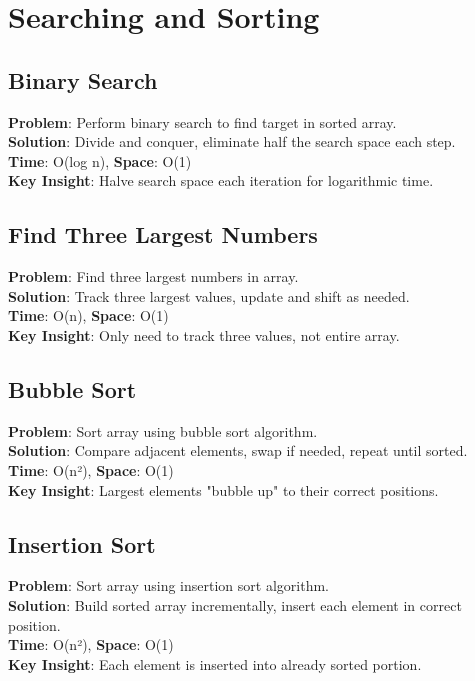 \documentclass{report}
\begin{document}
\section{Searching and Sorting}

\subsection{Binary Search}
\textbf{Problem}: Perform binary search to find target in sorted array.\\
\textbf{Solution}: Divide and conquer, eliminate half the search space each step.\\
\textbf{Time}: O(log n), \textbf{Space}: O(1)\\
\textbf{Key Insight}: Halve search space each iteration for logarithmic time.

\subsection{Find Three Largest Numbers}
\textbf{Problem}: Find three largest numbers in array.\\
\textbf{Solution}: Track three largest values, update and shift as needed.\\
\textbf{Time}: O(n), \textbf{Space}: O(1)\\
\textbf{Key Insight}: Only need to track three values, not entire array.

\subsection{Bubble Sort}
\textbf{Problem}: Sort array using bubble sort algorithm.\\
\textbf{Solution}: Compare adjacent elements, swap if needed, repeat until sorted.\\
\textbf{Time}: O(n²), \textbf{Space}: O(1)\\
\textbf{Key Insight}: Largest elements "bubble up" to their correct positions.

\subsection{Insertion Sort}
\textbf{Problem}: Sort array using insertion sort algorithm.\\
\textbf{Solution}: Build sorted array incrementally, insert each element in correct position.\\
\textbf{Time}: O(n²), \textbf{Space}: O(1)\\
\textbf{Key Insight}: Each element is inserted into already sorted portion.
\end{document}
